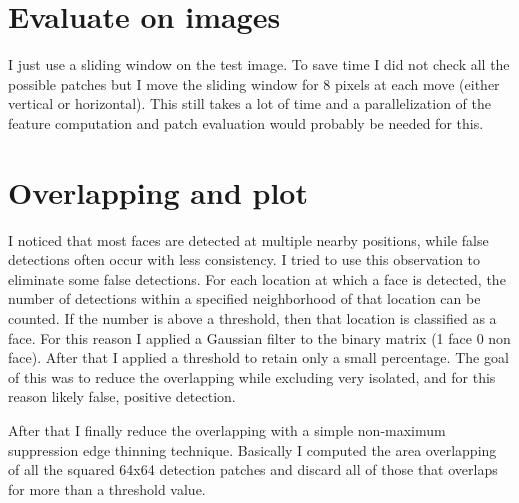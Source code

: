 \documentclass[11pt]{amsart}
\begin{document}
\section{Evaluate on images}
I just use a sliding window on the test image. To save time I did not check all the possible patches but I move the sliding window for 8 pixels at each move (either vertical or horizontal). This still takes a lot of time and a parallelization of the feature computation and patch evaluation would probably be needed for this.


\section{Overlapping and plot}
I noticed that most faces are detected at multiple nearby positions, while false detections often occur with less consistency. I tried to use this observation to eliminate some false detections. For each location at which a face is detected, the number of detections within a specified neighborhood of that location can be counted. If the number is above a threshold, then that location is classified as a face. For this reason I applied a Gaussian filter to the 
binary matrix (1 face 0 non face). After that I applied a threshold to retain only a small percentage. The goal of this was to reduce the overlapping while excluding very isolated, and for this reason likely false, positive detection.

After that I finally reduce the overlapping with a simple non-maximum suppression edge thinning technique. Basically I computed the area overlapping of all the squared 64x64 detection patches and discard all of those that overlaps for more than a threshold value.


%
%
%
\end{document}

